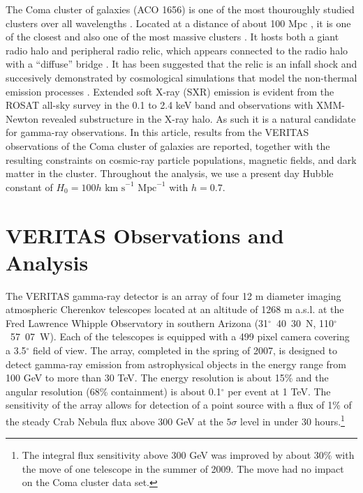 \documentclass[12pt,manuscript]{aastex}
\begin{document}
The Coma cluster of galaxies (ACO 1656) is one of the most thouroughly studied clusters over all wavelengths \citep{article:Voges_etal:1999}. Located at a distance of about 100 Mpc \citep[$z=0.023$;][]{article:StrubleRood:1999}, it is one of the closest and also one of the most massive clusters \citep[$M \sim 10^{15}M_{\odot}$;][]{article:Smith:1983, article:Kubo_etal:2008}. It hosts both a giant radio halo \citep{article:Giovannini_etal:1993,article:Thierbach_etal:2003} and peripheral radio relic, which appears connected to the radio halo with a ``diffuse'' bridge \citep[see discussion in][]{article:BrownRudnick:2010}. It has been suggested that the relic is an infall shock \citep{1998A&A...332..395E} and succesively demonstrated by cosmological simulations that model the non-thermal emission processes \citep{2008MNRAS.385.1211P,2008MNRAS.385.1242P,2009MNRAS.393.1073B, 2011ApJ...735...96S}. Extended soft X-ray (SXR) emission is evident from the ROSAT all-sky survey in the 0.1 to 2.4 keV band \citep{article:BrielHenryBohringer:1992} and observations with XMM-Newton \citep{article:Briel_etal:2001} revealed substructure in the X-ray halo. As such it is a natural candidate for gamma-ray observations. In this article, results from the VERITAS observations of the Coma cluster of galaxies are reported, together with the resulting constraints on cosmic-ray particle populations, magnetic fields, and dark matter in the cluster. Throughout the analysis, we use a present day Hubble constant of $H_0 = 100 h \mbox{ km s}^{-1} \mbox{ Mpc}^{-1}$ with $h=0.7$.

\section{VERITAS Observations and Analysis}
The VERITAS gamma-ray detector \citep{article:Weekes_etal:2002} is an array of four 12 m diameter imaging atmospheric Cherenkov telescopes \citep[IACTs;][]{article:Holder_etal:2006} located at an altitude of 1268 m a.s.l. at the Fred Lawrence Whipple Observatory in southern Arizona (31$^{\circ}$~40\arcmin~30\arcsec~N, 110$^{\circ}$~57\arcmin~07\arcsec~W). Each of the telescopes is equipped with a 499 pixel camera covering a 3.5$^{\circ}$ field of view. The array, completed in the spring of 2007, is designed to detect gamma-ray emission from astrophysical objects in the energy range from 100 GeV to more than 30 TeV. The energy resolution is about 15\% and the angular resolution (68\% containment) is about 0.1$^{\circ}$ per event at 1 TeV. The sensitivity of the array allows for detection of a point source with a flux of 1\% of the steady Crab Nebula flux above 300 GeV at the $5\sigma$ level in under 30 hours.\footnote{The integral flux sensitivity above 300 GeV was improved by about 30\% with the move of one telescope in the summer of 2009. The move had no impact on the Coma cluster data set.}
\end{document}

